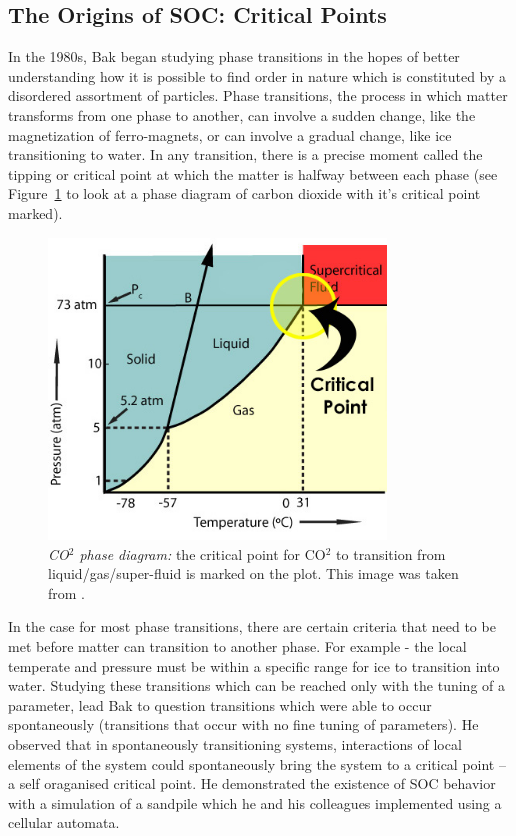 \documentclass{book}
\begin{document}
\subsection{The Origins of SOC: Critical Points}
In the 1980s, Bak began studying phase transitions in the hopes of better understanding how it is possible to find order in nature which is constituted by a disordered assortment of particles. Phase transitions, the process in which matter transforms from one phase to another, can involve a sudden change, like the magnetization of ferro-magnets, or can involve a gradual change, like ice transitioning to water. In any transition, there is a precise moment called the tipping or critical point at which the matter is halfway between each phase (see Figure~\ref{fig:critPoint} to look at a phase diagram of carbon dioxide with it's critical point marked).

\begin{figure}[h]
	\centering
	\includegraphics[width=0.8\textwidth]{Figures/Intro/SandPileFigs/critical_co2}
	\caption[CO$^2$ phase diagram]{\textit{CO$^2$ phase diagram:} the critical point for CO$^2$ to transition from liquid/gas/super-fluid is marked on the plot. This image was taken from \cite{IMGCriticalPoint}. }
	\label{fig:critPoint}
\end{figure}


 In the case for most phase transitions, there are certain criteria that need to be met before matter can transition to another phase. For example - the local temperate and pressure must be within a specific range for ice to transition into water. Studying these transitions which can be reached only with the tuning of a parameter, lead Bak to question transitions which were able to occur spontaneously (transitions that occur with no fine tuning of parameters). He observed that in spontaneously transitioning systems, interactions of local elements of the system could spontaneously bring the system to a critical point -- a self oraganised critical point. He demonstrated the existence of SOC behavior with a simulation of a sandpile which he and his colleagues implemented using a cellular automata. 
\end{document}
